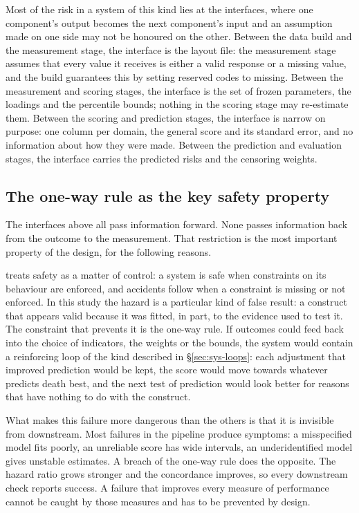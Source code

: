 Most of the risk in a system of this kind lies at the interfaces, where one component's output becomes the next component's input and an assumption made on one side may not be honoured on the other. Between the data build and the measurement stage, the interface is the layout file: the measurement stage assumes that every value it receives is either a valid response or a missing value, and the build guarantees this by setting reserved codes to missing. Between the measurement and scoring stages, the interface is the set of frozen parameters, the loadings and the percentile bounds; nothing in the scoring stage may re-estimate them. Between the scoring and prediction stages, the interface is narrow on purpose: one column per domain, the general score and its standard error, and no information about how they were made. Between the prediction and evaluation stages, the interface carries the predicted risks and the censoring weights.

\subsection{The one-way rule as the key safety property}

The interfaces above all pass information forward. None passes information back from the outcome to the measurement. That restriction is the most important property of the design, for the following reasons.

\citet{leveson_2011} treats safety as a matter of control: a system is safe when constraints on its behaviour are enforced, and accidents follow when a constraint is missing or not enforced. In this study the hazard is a particular kind of false result: a construct that appears valid because it was fitted, in part, to the evidence used to test it. The constraint that prevents it is the one-way rule. If outcomes could feed back into the choice of indicators, the weights or the bounds, the system would contain a reinforcing loop of the kind described in \S\ref{sec:sys-loops}: each adjustment that improved prediction would be kept, the score would move towards whatever predicts death best, and the next test of prediction would look better for reasons that have nothing to do with the construct.

What makes this failure more dangerous than the others is that it is invisible from downstream. Most failures in the pipeline produce symptoms: a misspecified model fits poorly, an unreliable score has wide intervals, an underidentified model gives unstable estimates. A breach of the one-way rule does the opposite. The hazard ratio grows stronger and the concordance improves, so every downstream check reports success. A failure that improves every measure of performance cannot be caught by those measures and has to be prevented by design.

